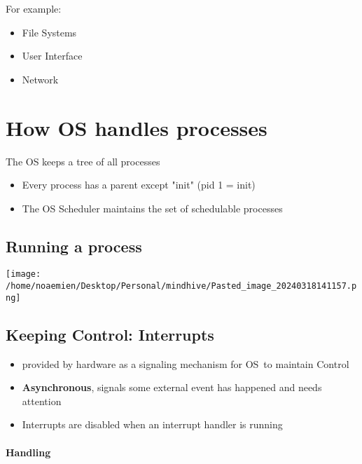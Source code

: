 \documentclass[
]{article}
\providecommand{\tightlist}{%
  \setlength{\itemsep}{0pt}\setlength{\parskip}{0pt}}
\begin{document}
For example:

\begin{itemize}
\tightlist
\item
  File Systems
\item
  User Interface
\item
  Network
\end{itemize}

\hypertarget{how-os-handles-processes}{%
\section{How OS handles processes}\label{how-os-handles-processes}}

The OS keeps a tree of all processes

\begin{itemize}
\tightlist
\item
  Every process has a parent except "init" (pid 1 = init)
\item
  The OS Scheduler maintains the set of schedulable processes
\end{itemize}

\hypertarget{running-a-process}{%
\subsection{Running a process}\label{running-a-process}}

\texttt{[image: /home/noaemien/Desktop/Personal/mindhive/Pasted\_image\_20240318141157.png]}

\hypertarget{keeping-control-interrupts}{%
\subsection{Keeping Control:
Interrupts}\label{keeping-control-interrupts}}

\begin{itemize}
\tightlist
\item
  provided by hardware as a signaling mechanism for OS~to maintain
  Control
\item
  \textbf{Asynchronous}, signals some external event has happened and
  needs attention
\item
  Interrupts are disabled when an interrupt handler is running
\end{itemize}

\hypertarget{handling}{%
\paragraph{Handling}\label{handling}}
\end{document}
